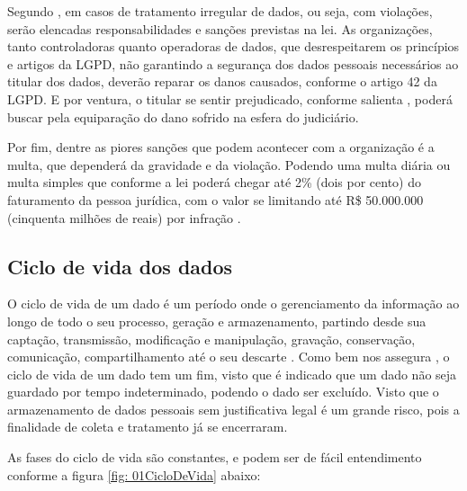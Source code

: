 \documentclass[
	12pt,				%
	openright,			%
	oneside,			%
	a4paper,			%
	english,			%
	french,				%
	spanish,			%
	brazil,				%
	]{abntex2}
\begin{document}
Segundo , em casos de tratamento irregular de dados, ou seja, com violações, serão elencadas responsabilidades e sanções previstas na lei. As organizações, tanto controladoras quanto operadoras de dados, que desrespeitarem os princípios e artigos da LGPD, não garantindo a segurança dos dados pessoais necessários ao titular dos dados, deverão reparar os danos causados, conforme o artigo 42 da LGPD. E por ventura, o titular se sentir prejudicado, conforme salienta , poderá buscar pela equiparação do dano sofrido na esfera do judiciário.



Por fim, dentre as piores sanções que podem acontecer com a organização é a multa, que dependerá da gravidade e da violação. Podendo uma multa diária ou multa simples que conforme a lei poderá chegar até 2\% (dois por cento) do faturamento da pessoa jurídica, com o valor se limitando até R\$ 50.000.000 (cinquenta milhões de reais) por infração \cite{01-01-LeiGeral}. 


\subsection{Ciclo de vida dos dados}
O ciclo de vida de um dado é um período onde o gerenciamento da informação ao longo de todo o seu processo, geração e armazenamento, partindo desde sua captação, transmissão, modificação e manipulação, gravação, conservação, comunicação, compartilhamento até o seu descarte \cite{Pinheiro2021}. Como bem nos assegura , o ciclo de vida de um dado tem um fim, visto que é indicado que um dado não seja guardado por tempo indeterminado, podendo o dado ser excluído. Visto que o armazenamento de dados pessoais sem justificativa legal é um grande risco, pois a finalidade de coleta e tratamento já se encerraram.

As fases do ciclo de vida são constantes, e podem ser de fácil entendimento conforme a figura \ref{fig: 01CicloDeVida} abaixo:
\end{document}
